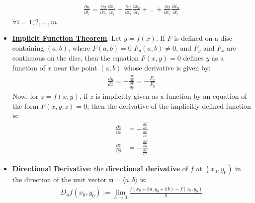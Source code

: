\documentclass[11pt]{article}
\newcommand{\dfn}[1]{\underline{\textbf{#1}}}
\begin{document}
\begin{itemize}[noitemsep]
	\begin{align}
		\frac{\partial u}{\partial t_i} = \frac{\partial u}{\partial x_i} \frac{\partial x_1}{\partial t_i}	+ \frac{\partial u}{\partial x_i} \frac{\partial x_2}{\partial t_i} + ... + \frac{\partial u}{\partial x_i} \frac{\partial x_n}{\partial t_i}
	\end{align}
	$\forall i = 1, 2, ..., m$. 
	\item \dfn{Implicit Function Theorem}: Let $y=f(x)$. If $F$ is defined on a disc containing $(a,b)$, where $F(a,b) = 0$ $F_y(a,b) \neq 0$, and $F_y$ and $F_x$ are continuous on the disc, then the equation $F(x,y) = 0$ defines $y$ as a function of $x$ near the point $(a,b)$ whose derivative is given by: 
	\begin{align}
		\frac{dy}{dx} = - \frac{\frac{\partial F}{\partial x}}{\frac{\partial F}{\partial y}} = - \frac{F_x}{F_y}	
	\end{align}
	Now, for $z=f(x,y)$, if $z$ is implicitly given as a function by an equation of the form $F(x,y,z) =0$, then the derivative of the implicitly defined function is: 
	\begin{align}
		\frac{\partial z}{\partial x} & = - \frac{\frac{\partial F}{\partial x}}{\frac{\partial F}{\partial z}}	\\
		\frac{\partial z}{\partial y} & = - \frac{\frac{\partial F}{\partial y}}{\frac{\partial F}{\partial z}}
	\end{align}
	\item \dfn{Directional Derivative}: the \dfn{directional derivative} of $f$ at $(x_0, y_0)$ in the direction of the unit vector $\mathbf{u} = \langle a, b \rangle$ is:
	\begin{align}
		D_uf(x_0, y_0) := \lim_{h \rightarrow 0 } \frac{f(x_0 + ha, y_0 + hb) - f(x_0, y_0)}{h}	
	\end{align}
	
\end{itemize}
\end{document}
